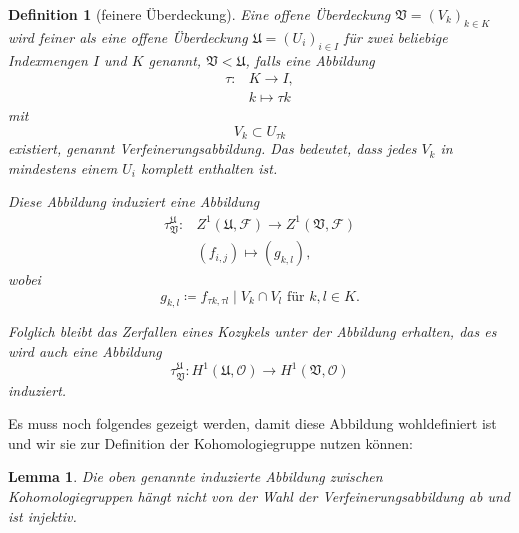 \documentclass[11pt,a4paper]{scrartcl}
\theoremstyle{thm}
\newtheorem{lemma}{Lemma}[section]
\theoremstyle{def}
\newtheorem{defi}{Definition}[section]
\theoremstyle{remark}
\begin{document}
\begin{defi}[feinere Überdeckung]
Eine offene Überdeckung $\mathfrak{V}=(V_k)_{k\in K}$ wird \emph{feiner} als eine offene Überdeckung $\mathfrak{U}=(U_i)_{i\in I}$ für zwei beliebige Indexmengen $I$ und $K$ genannt, $\mathfrak{V}<\mathfrak{U}$, falls eine Abbildung 
\begin{align*}
\tau: & K\rightarrow I,\\
	  & k\mapsto \tau k
\end{align*}
mit
\[
V_{k}\subset U_{\tau k}
\]
existiert, genannt \emph{Verfeinerungsabbildung}. Das bedeutet, dass jedes $V_k$ in mindestens einem $U_i$ komplett enthalten ist.

Diese Abbildung induziert eine Abbildung
\begin{align*}
\tau_{\mathfrak{V}}^{\mathfrak{U}}:& Z^1(\mathfrak{U},\mathcal{F})\rightarrow Z^1(\mathfrak{V},\mathcal{F})\\
&(f_{i,j})\mapsto (g_{k,l}),
\end{align*}
wobei 
\[
g_{k,l} \coloneqq  f_{\tau k,\tau l}\mid V_k\cap V_l\text{ für } k,l\in K.
\]

Folglich bleibt das Zerfallen eines Kozykels unter der Abbildung erhalten, das es wird auch eine Abbildung 
\[
\tau_{\mathfrak{V}}^{\mathfrak{U}}:H^1(\mathfrak{U},\mathcal{O})\rightarrow H^1(\mathfrak{V},\mathcal{O})
\]
induziert.
\end{defi}
Es muss noch folgendes gezeigt werden, damit diese Abbildung wohldefiniert ist und wir sie zur Definition der Kohomologiegruppe nutzen können:
\begin{lemma}
Die oben genannte induzierte Abbildung zwischen Kohomologiegruppen  hängt nicht von der Wahl der Verfeinerungsabbildung ab und ist injektiv.
\end{lemma}
\end{document}
